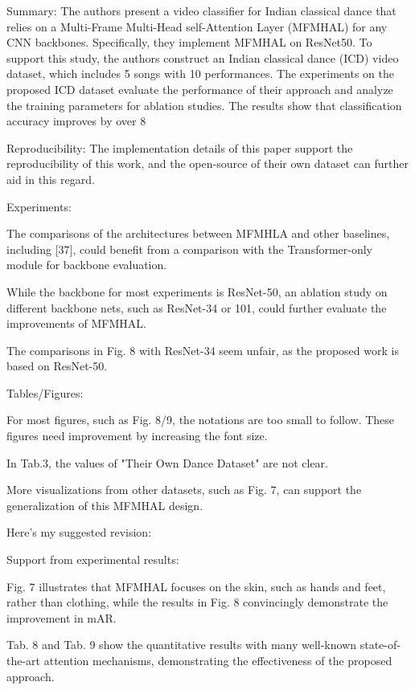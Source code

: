 Summary: The authors present a video classifier for Indian classical dance that relies on a Multi-Frame Multi-Head self-Attention Layer (MFMHAL) for any CNN backbones. Specifically, they implement MFMHAL on ResNet50. To support this study, the authors construct an Indian classical dance (ICD) video dataset, which includes 5 songs with 10 performances. The experiments on the proposed ICD dataset evaluate the performance of their approach and analyze the training parameters for ablation studies. The results show that classification accuracy improves by over 8%

Reproducibility: The implementation details of this paper support the reproducibility of this work, and the open-source of their own dataset can further aid in this regard.

Experiments:

The comparisons of the architectures between MFMHLA and other baselines, including [37], could benefit from a comparison with the Transformer-only module for backbone evaluation.

While the backbone for most experiments is ResNet-50, an ablation study on different backbone nets, such as ResNet-34 or 101, could further evaluate the improvements of MFMHAL.

The comparisons in Fig. 8 with ResNet-34 seem unfair, as the proposed work is based on ResNet-50.

Tables/Figures:

For most figures, such as Fig. 8/9, the notations are too small to follow. These figures need improvement by increasing the font size.

In Tab.3, the values of "Their Own Dance Dataset" are not clear.

More visualizations from other datasets, such as Fig. 7, can support the generalization of this MFMHAL design.










Here's my suggested revision:

Support from experimental results:

Fig. 7 illustrates that MFMHAL focuses on the skin, such as hands and feet, rather than clothing, while the results in Fig. 8 convincingly demonstrate the improvement in mAR.

Tab. 8 and Tab. 9 show the quantitative results with many well-known state-of-the-art attention mechanisms, demonstrating the effectiveness of the proposed approach.

